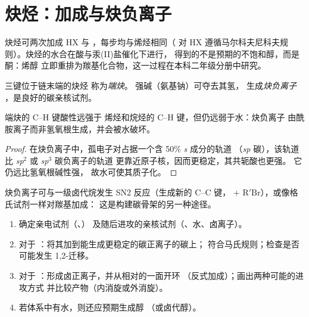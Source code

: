 \section{炔烃：加成与炔负离子}

炔烃可两次加成 HX 与 ，每步均与烯烃相同（
对 HX 遵循马尔科夫尼科夫规则）。炔烃的水合在酸与汞(II)盐催化下进行，
得到的不是预期的不饱和醇，而是酮：烯醇
立即重排为羰基化合物，这一过程在本科二年级分册中研究。

\begin{definition}[端炔、炔负离子]\label{def:b1:electrophilic-additions:acetylide}
三键位于链末端的炔烃  称为\emph{端炔}。
强碱（氨基钠）可夺去其氢，
生成\emph{炔负离子}
，是良好的碳亲核试剂。
\end{definition}

\begin{proposition}[端炔的酸性]\label{prop:b1:electrophilic-additions:acetylide-acidity}
端炔的 C--H 键酸性远强于
烯烃和烷烃的 C--H 键，但仍远弱于水：炔负离子
由酰胺离子而非氢氧根生成，并会被水破坏。
\end{proposition}

\begin{proof}
在炔负离子中，孤电子对占据一个含 50\% \textit{s} 成分的轨道
（\textit{sp} 碳），该轨道比 \textit{sp}$^2$ 或 \textit{sp}$^3$ 碳负离子的轨道
更靠近原子核，因而更稳定，其共轭酸也更强。
它仍远比氢氧根碱性强，
故水可使其质子化。
\end{proof}

炔负离子可与一级卤代烷发生 SN2 反应（生成新的 C--C 键，
 + $\mathrm{R'Br}$），或像格氏试剂一样对羰基加成：
这是构建碳骨架的另一种途径。

\begin{method}[预测加成产物]\label{met:b1:electrophilic-additions:predict-addition}
\begin{enumerate}
  \item 确定亲电试剂（、）
        及随后进攻的亲核试剂（、水、卤离子）。
  \item 对于 ：将其加到能生成更稳定的碳正离子的碳上；
        符合马氏规则；检查是否可能发生 1,2-迁移。
  \item 对于 ：形成卤正离子，并从相对的一面开环
        （反式加成）；画出两种可能的进攻方式
        并比较产物（内消旋或外消旋）。
  \item 若体系中有水，则还应预期生成醇
        （或卤代醇）。
\end{enumerate}
\end{method}

